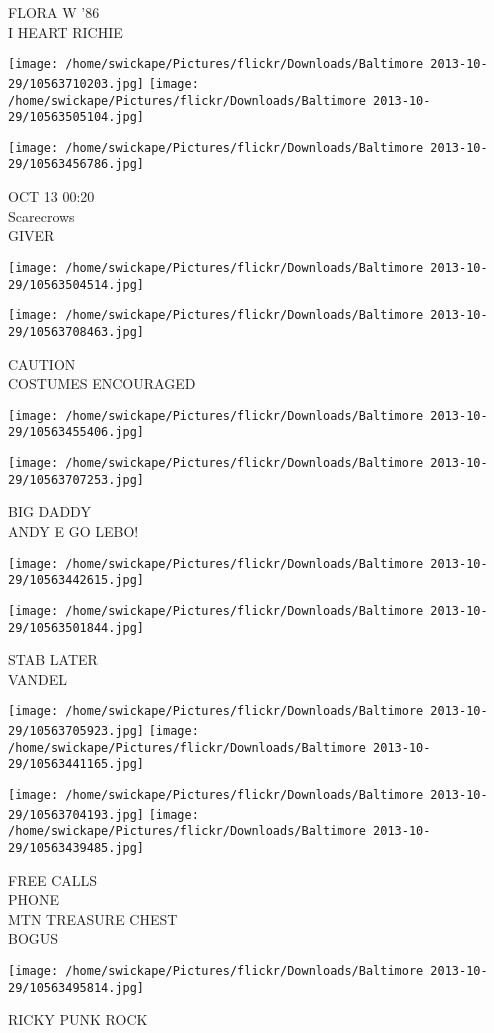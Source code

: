 \documentclass[10pt,letterpaper]{article}
\begin{document}
FLORA W '86\\
I HEART RICHIE
\pagebreak

\texttt{[image: /home/swickape/Pictures/flickr/Downloads/Baltimore 2013-10-29/10563710203.jpg]}
\texttt{[image: /home/swickape/Pictures/flickr/Downloads/Baltimore 2013-10-29/10563505104.jpg]}

\texttt{[image: /home/swickape/Pictures/flickr/Downloads/Baltimore 2013-10-29/10563456786.jpg]}

OCT 13 00:20\\
Scarecrows\\
GIVER
\pagebreak

\texttt{[image: /home/swickape/Pictures/flickr/Downloads/Baltimore 2013-10-29/10563504514.jpg]}

\vspace{0.25in}
\texttt{[image: /home/swickape/Pictures/flickr/Downloads/Baltimore 2013-10-29/10563708463.jpg]}

CAUTION\\
COSTUMES ENCOURAGED
\pagebreak

\texttt{[image: /home/swickape/Pictures/flickr/Downloads/Baltimore 2013-10-29/10563455406.jpg]}

\vspace{0.25in}
\texttt{[image: /home/swickape/Pictures/flickr/Downloads/Baltimore 2013-10-29/10563707253.jpg]}

BIG DADDY\\
ANDY E GO LEBO!
\pagebreak

\texttt{[image: /home/swickape/Pictures/flickr/Downloads/Baltimore 2013-10-29/10563442615.jpg]}

\vspace{0.25in}
\texttt{[image: /home/swickape/Pictures/flickr/Downloads/Baltimore 2013-10-29/10563501844.jpg]}

STAB LATER\\
VANDEL
\pagebreak

\texttt{[image: /home/swickape/Pictures/flickr/Downloads/Baltimore 2013-10-29/10563705923.jpg]}
\texttt{[image: /home/swickape/Pictures/flickr/Downloads/Baltimore 2013-10-29/10563441165.jpg]}

\texttt{[image: /home/swickape/Pictures/flickr/Downloads/Baltimore 2013-10-29/10563704193.jpg]}
\texttt{[image: /home/swickape/Pictures/flickr/Downloads/Baltimore 2013-10-29/10563439485.jpg]}

FREE CALLS\\
PHONE\\
MTN TREASURE CHEST\\
BOGUS
\pagebreak

\texttt{[image: /home/swickape/Pictures/flickr/Downloads/Baltimore 2013-10-29/10563495814.jpg]}

RICKY PUNK ROCK
\pagebreak
\end{document}
